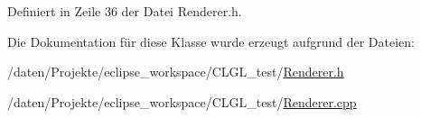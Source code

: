Definiert in Zeile 36 der Datei Renderer.\-h.



Die Dokumentation für diese Klasse wurde erzeugt aufgrund der Dateien\-:\begin{DoxyCompactItemize}
\item 
/daten/\-Projekte/eclipse\-\_\-workspace/\-C\-L\-G\-L\-\_\-test/\hyperlink{CLGL__test_2Renderer_8h}{Renderer.\-h}\item 
/daten/\-Projekte/eclipse\-\_\-workspace/\-C\-L\-G\-L\-\_\-test/\hyperlink{CLGL__test_2Renderer_8cpp}{Renderer.\-cpp}\end{DoxyCompactItemize}
